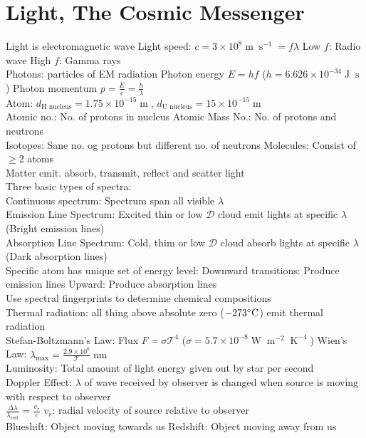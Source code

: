 \documentclass{article}
\DeclareMathOperator{\s}{s}
\DeclareMathOperator{\nm}{nm}
\DeclareMathOperator{\m}{m}
\DeclareMathOperator{\K}{K}
\DeclareMathOperator{\J}{J}
\DeclareMathOperator{\W}{W}
\begin{document}
\section{Light, The Cosmic Messenger}
Light is electromagnetic wave \quad Light speed: $c=3\times 10^{8}\m\s^{-1}=f\lambda$ \quad Low $f$: Radio wave \quad High $f$: Gamma rays\\
Photons: particles of EM radiation \quad Photon energy $E=hf$ ($h=6.626\times 10^{-34}\J\s$) Photon momentum $p=\frac{E}{c}=\frac{h}{\lambda}$\\
Atom: $d_{\text{H nucleus}}=1.75\times 10^{-15}\m$, $d_{\text{U nucleus}}=15\times 10^{-15}\m$\\
Atomic no.: No. of protons in nucleus \quad Atomic Mass No.: No. of protons and neutrons\\
Isotopes: Sane no. og protons but different no. of neutrons \quad Molecules: Consist of $\geq 2$ atoms\\
Matter emit. absorb, transmit, reflect and scatter light\\
Three basic types of spectra:\\
Continuous spectrum: Spectrum span all visible $\lambda$\\
Emission Line Spectrum: Excited thin or low $\mathcal{D}$ cloud emit lights at specific $\lambda$ (Bright emission lines)\\
Absorption Line Spectrum: Cold, thim or low $\mathcal{D}$ cloud absorb lights at specific $\lambda$ (Dark absorption lines)\\
Specific atom has unique set of energy level: Downward transitions: Produce emission lines \quad Upward: Produce absorption lines\\
Use spectral fingerprints to determine chemical compositions\\
Thermal radiation: all thing above absolute zero ($-273\celsius$) emit thermal radiation\\
Stefan-Boltzmann's Law: Flux $F=\sigma\mathcal{T}^{4}$ ($\sigma=5.7\times 10^{-8}\W\m^{-2}\K^{-4}$) \qquad Wien's Law: $\lambda_{\text{max}}=\frac{2.9\times 10^{6}}{\mathcal{T}}\nm$\\
Luminosity: Total amount of light energy given out by star per second\\
Doppler Effect: $\lambda$ of wave received by observer is changed when source is moving with respect to observer\\
$\frac{\Delta\lambda}{\lambda_{\text{rest}}}=\frac{v_{r}}{c}$ $v_{r}$: radial velocity of source relative to observer\\
Blueshift: Object moving towards us \qquad Redshift: Object moving away from us
\end{document}
